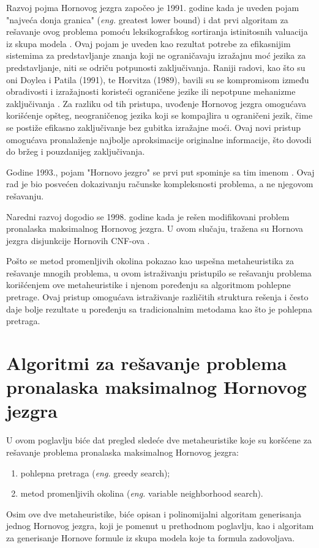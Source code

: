 \documentclass[12pt,oneside]{memoir}
\begin{document}
Razvoj pojma Hornovog jezgra započeo je 1991. godine kada je uveden pojam "najveća donja granica" (\textit{eng.} greatest lower bound) i dat prvi algoritam za rešavanje ovog problema pomoću leksikografskog sortiranja istinitosnih valuacija iz skupa modela \cite{doc2}. Ovaj pojam je uveden kao rezultat potrebe za efikasnijim sistemima za predstavljanje znanja koji ne ograničavaju izražajnu moć jezika za predstavljanje, niti se odriču potpunosti zaključivanja. Raniji radovi, kao što su oni Doylea i Patila (1991), te Horvitza (1989), bavili su se kompromisom između obradivosti i izražajnosti koristeći ograničene jezike ili nepotpune mehanizme zaključivanja \cite{doyle1991, horvitz1989}. Za razliku od tih pristupa, uvođenje Hornovog jezgra omogućava korišćenje opšteg, neograničenog jezika koji se kompajlira u ograničeni jezik, čime se postiže efikasno zaključivanje bez gubitka izražajne moći. Ovaj novi pristup omogućava pronalaženje najbolje aproksimacije originalne informacije, što dovodi do bržeg i pouzdanijeg zaključivanja.

Godine 1993., pojam "Hornovo jezgro" se prvi put spominje sa tim imenom \cite{doc3}. Ovaj rad je bio posvećen dokazivanju računske kompleksnosti problema, a ne njegovom rešavanju.

Naredni razvoj dogodio se 1998. godine kada je rešen modifikovani problem pronalaska maksimalnog Hornovog jezgra. U ovom slučaju, tražena su Hornova jezgra disjunkcije Hornovih CNF-ova \cite{doc1}.

Pošto se metod promenljivih okolina pokazao kao uspešna metaheuristika za rešavanje mnogih problema, u ovom istraživanju pristupilo se rešavanju problema korišćenjem ove metaheuristike i njenom poređenju sa algoritmom pohlepne pretrage. Ovaj pristup omogućava istraživanje različitih struktura rešenja i često daje bolje rezultate u poređenju sa tradicionalnim metodama kao što je pohlepna pretraga.


\chapter{Algoritmi za rešavanje problema pronalaska maksimalnog Hornovog jezgra}
U ovom poglavlju biće dat pregled sledeće dve metaheuristike koje su koršćene za rešavanje problema pronalaska maksimalnog Hornovog jezgra:
\label{chap:algoritmi}

\begin{enumerate}
  \item pohlepna pretraga (\textit{eng.} greedy search);
  \item metod promenljivih okolina (\textit{eng.} variable neighborhood search).
\end{enumerate}
Osim ove dve metaheuristike, biće opisan i polinomijalni algoritam generisanja jednog Hornovog jezgra, koji je pomenut u prethodnom poglavlju, kao i algoritam za generisanje Hornove formule iz skupa modela koje ta formula zadovoljava.
\end{document}
